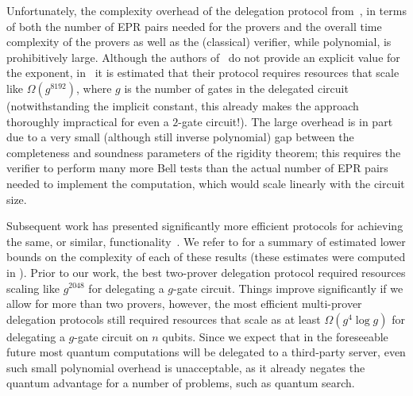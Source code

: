 \documentclass{toc}
\begin{document}
Unfortunately, the complexity overhead of the delegation protocol from~\cite{reichardt2012classical}, in terms of both the number of EPR pairs needed for the provers and the overall time complexity of the provers as well as the (classical) verifier, while polynomial, is prohibitively large. Although the authors of~\cite{reichardt2012classical} do not provide an explicit value for the exponent, in~\cite{hajdusek2015} it is estimated that their protocol requires resources that scale like $\Omega(g^{8192})$, where $g$ is the number of gates in the delegated circuit (notwithstanding the implicit constant, this already makes the approach thoroughly impractical for even a $2$-gate circuit!).
The large overhead is in part due to a very small (although still inverse polynomial) gap between the completeness and soundness parameters of the rigidity theorem; this requires the verifier to perform many more Bell tests than the actual number of EPR pairs needed to implement the computation, which would scale linearly with the circuit size. 

Subsequent work has presented significantly more efficient protocols for achieving the same, or similar,  functionality~\cite{McKague16,Gheorghiu15,hajdusek2015}. We refer to 
for a summary of estimated lower bounds on the complexity of each of these
results (these estimates were computed in \cite{hajdusek2015}). Prior to our
work, the best two-prover delegation protocol required resources scaling like
$g^{2048}$ for delegating a $g$-gate circuit. Things improve significantly if we
allow for more than two provers, however, the most efficient multi-prover
delegation protocols still required resources that scale
as at least $\Omega(g^4\log{g})$ for delegating a $g$-gate circuit on $n$ qubits.
Since we expect that in the foreseeable future most quantum computations will be delegated to a third-party server, even such small polynomial overhead is unacceptable, as it already negates the quantum advantage for a number of problems, such as quantum search.
\end{document}
